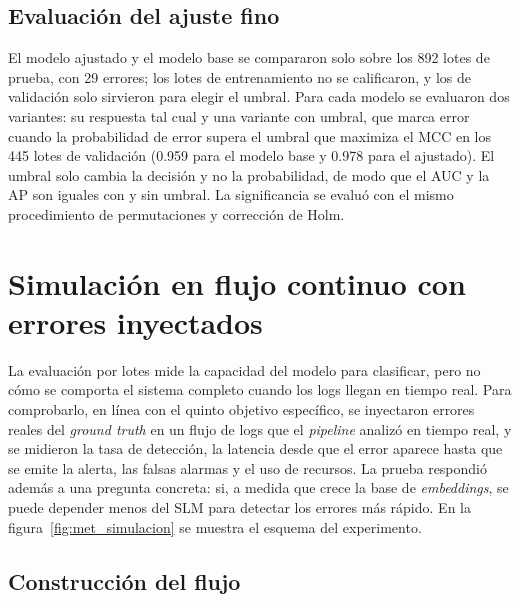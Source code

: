 \subsection{Evaluación del ajuste fino}

El modelo ajustado y el modelo base se compararon solo sobre los 892 lotes de prueba, con 29 errores; los lotes de entrenamiento no se calificaron, y los de validación solo sirvieron para elegir el umbral. Para cada modelo se evaluaron dos variantes: su respuesta tal cual y una variante con umbral, que marca error cuando la probabilidad de error supera el umbral que maximiza el MCC en los 445 lotes de validación (0.959 para el modelo base y 0.978 para el ajustado). El umbral solo cambia la decisión y no la probabilidad, de modo que el AUC y la AP son iguales con y sin umbral. La significancia se evaluó con el mismo procedimiento de permutaciones y corrección de Holm.

\section{Simulación en flujo continuo con errores inyectados}\label{sec:met_simulacion}\label{sec:met_inyeccion}

La evaluación por lotes mide la capacidad del modelo para clasificar, pero no cómo se comporta el sistema completo cuando los logs llegan en tiempo real. Para comprobarlo, en línea con el quinto objetivo específico, se inyectaron errores reales del \textit{ground truth} en un flujo de logs que el \textit{pipeline} analizó en tiempo real, y se midieron la tasa de detección, la latencia desde que el error aparece hasta que se emite la alerta, las falsas alarmas y el uso de recursos. La prueba respondió además a una pregunta concreta: si, a medida que crece la base de \textit{embeddings}, se puede depender menos del SLM para detectar los errores más rápido. En la figura~\ref{fig:met_simulacion} se muestra el esquema del experimento.


\subsection{Construcción del flujo}


